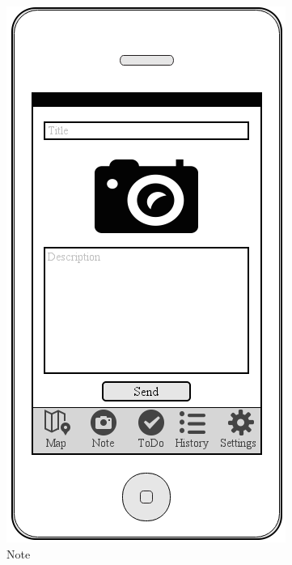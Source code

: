 \documentclass[12pt]{article}
\begin{document}
\begin{figure}[ht]
	\includegraphics[width=\linewidth, height=0.4\textheight, keepaspectratio=true]{mockups/Note.png}
	\caption{Note}
	\endminipage\hfill
	\centering

\end{figure}
\end{document}
